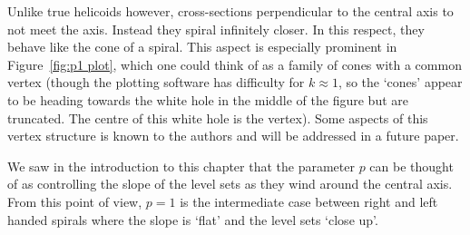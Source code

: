 \documentclass{article}
\begin{document}
Unlike true helicoids however, cross-sections perpendicular to the central axis to not meet the axis. Instead they spiral infinitely closer. In this respect, they behave like the cone of a spiral. This aspect is especially prominent in Figure~\ref{fig:p1 plot}, which one could think of as a family of cones with a common vertex (though the plotting software has difficulty for $k\approx 1$, so the `cones' appear to be heading towards the white hole in the middle of the figure but are truncated. The centre of this white hole is the vertex). Some aspects of this vertex structure is known to the authors and will be addressed in a future paper. 

We saw in the introduction to this chapter that the parameter $p$ can be thought of as controlling the slope of the level sets as they wind around the central axis. From this point of view, $p=1$ is the intermediate case between right and left handed spirals where the slope is `flat' and the level sets `close up'.
\end{document}
